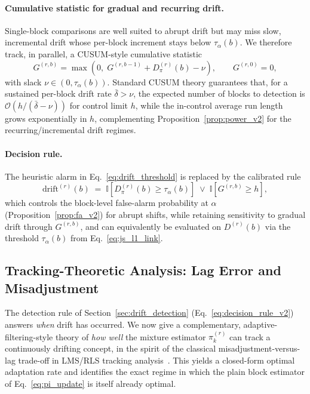 ﻿\documentclass[12pt,a4paper]{article}
\DeclareMathOperator{\JS}{D_{JS}}
\begin{document}
\paragraph{Cumulative statistic for gradual and recurring drift.}
Single-block comparisons are well suited to abrupt drift but may miss slow,
incremental drift whose per-block increment stays below $\tau_\alpha(b)$. We
therefore track, in parallel, a CUSUM-style cumulative statistic~\cite{Page1954}
\begin{equation}
	G^{(r,b)}=\max\!\left(0,\;G^{(r,b-1)}+D_\pi^{(r)}(b)-\nu\right),\qquad G^{(r,0)}=0,
	\label{eq:cusum_v2}
\end{equation}
with slack $\nu\in(0,\tau_\alpha(b))$. Standard CUSUM theory guarantees that,
for a sustained per-block drift rate $\bar\delta>\nu$, the expected number of
blocks to detection is $\mathcal{O}(h/(\bar\delta-\nu))$ for control limit
$h$, while the in-control average run length grows exponentially in $h$,
complementing Proposition~\ref{prop:power_v2} for the recurring/incremental
drift regimes.

\paragraph{Decision rule.} The heuristic alarm in
Eq.~\eqref{eq:drift_threshold} is replaced by the calibrated rule
\begin{equation}
	\text{drift}^{(r)}(b) \;=\;
	\mathbb{I}\!\left[D_\pi^{(r)}(b)\geq\tau_\alpha(b)\right]
	\;\vee\;
	\mathbb{I}\!\left[G^{(r,b)}\geq h\right],
	\label{eq:decision_rule_v2}
\end{equation}
which controls the block-level false-alarm probability at $\alpha$
(Proposition~\ref{prop:fa_v2}) for abrupt shifts, while retaining
sensitivity to gradual drift through $G^{(r,b)}$, and can equivalently be
evaluated on $D_{\JS}^{(r)}(b)$ via the threshold $\tau_\alpha^{\JS}(b)$ from
Eq.~\eqref{eq:js_l1_link}.

\subsection{Tracking-Theoretic Analysis: Lag Error and Misadjustment}
\label{sec:tracking_theory}

The detection rule of Section~\ref{sec:drift_detection}
(Eq.~\eqref{eq:decision_rule_v2}) answers \emph{when} drift has occurred. We
now give a complementary, adaptive-filtering-style theory of \emph{how well}
the mixture estimator $\pi_k^{(r)}$ can track a continuously drifting
concept, in the spirit of the classical misadjustment-versus-lag trade-off in
LMS/RLS tracking analysis~\cite{WidrowStearns1985,Sayed2003,Haykin2002}. This
yields a closed-form optimal adaptation rate and identifies the exact regime
in which the plain block estimator of Eq.~\eqref{eq:pi_update} is itself
already optimal.
\end{document}

